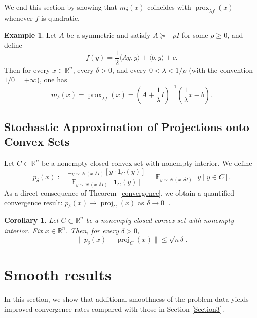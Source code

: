 \documentclass[11pt]{amsart}
\newcommand{\1}{\mathds{1}}
\newtheorem{corollary}[theorem]{Corollary}
\theoremstyle{definition}
\theoremstyle{remark}
\theoremstyle{definition}
\newtheorem{example}{Example}[section]
\begin{document}
We end this section by showing that $m_{\delta}(x)$ coincides with $\operatorname{prox}_{\lambda f}(x)$ whenever $f$ is quadratic.
\begin{example}
Let $A$ be a symmetric and satisfy $A\succeq -\rho I$ for some $\rho\geq 0$, and define $$f(y)=\frac{1}{2}\langle Ay,y\rangle +\langle b,y\rangle +c.$$
Then for every $x\in \mathbb{R}^n$, every $\delta>0$, and every $0<\lambda <1/\rho$ (with the convention $1/0=+\infty$), one has
$$m_{\delta}(x)=\operatorname{prox}_{\lambda f}(x)=\left(A+\frac{1}{\lambda}I\right)^{-1}\left(\frac{1}{\lambda}x-b\right).
$$
\end{example}



\subsection{Stochastic Approximation of Projections onto Convex Sets}
Let $C \subset \mathbb{R}^n$ be a nonempty closed convex set with nonempty interior. We define
$$
 p_{\delta}(x):=\frac{\mathbb{E}_{y\sim \mathcal{N}(x,\delta  I)}[y\cdot  \mathbf{1}_C(y)]}{\mathbb{E}_{y\sim \mathcal{N}(x,\delta  I)}[\mathbf{1}_C(y)]}=\mathbb{E}_{y\sim \mathcal{N}(x,\delta I)}[y\mid y\in C]. 
$$
As a direct consequence of Theorem~\ref{convergence}, we obtain a quantified convergence result: 
$p_{\delta}(x)\to \operatorname{proj}_{C}(x)$ as $\delta\to 0^{+}$. 
\begin{corollary}\label{cor:convex-set}
Let $C\subset \mathbb{R}^n$ be a nonempty closed convex set with nonempty interior. 
Fix $x\in \mathbb{R}^n$. Then, for every $\delta>0$,
\[
\|p_{\delta}(x)-\operatorname{proj}_C(x)\|\le \sqrt{n\,\delta}.
\]
\end{corollary}

\section{Smooth results}\label{Section4}
In this section, we show that additional smoothness of the problem data yields improved convergence rates compared with those in Section \ref{Section3}. 
\end{document}
